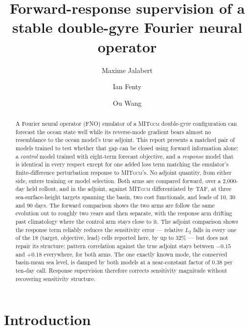 \documentclass[3p,12pt]{elsarticle}
\newcommand{\MITgcm}{\textsc{MITgcm}}
\newcommand{\FNO}{FNO}
\begin{document}
\begin{frontmatter}

\title{Forward-response supervision of a stable double-gyre Fourier neural operator}

\author[ucsb]{Maxime Jalabert}
\author[jpl]{Ian Fenty}
\author[jpl]{Ou Wang}


\begin{abstract}
A Fourier neural operator (\FNO{}) emulator of a \MITgcm{} double-gyre
configuration can forecast the ocean state well while its reverse-mode gradient
bears almost no resemblance to the ocean model's true adjoint. This report
presents a matched pair of models trained to test whether that gap can be closed
using forward information alone: a \emph{control} model trained with eight-term forecast objective, and a \emph{response} model
that is identical in every respect except for one added loss term matching the
emulator's finite-difference perturbation response to \MITgcm{}'s. No adjoint
quantity, from either side, enters training or model selection. Both arms are
compared forward, over a 2{,}000-day held rollout, and in the adjoint, against
\MITgcm{} differentiated by TAF, at three sea-surface-height targets spanning the
basin, two cost functionals, and leads of 10, 30 and 90 days. The forward
comparison shows the two arms are follow the same evolution out to roughly two years and
then separate, with the response arm drifting past climatology
where the control arm stays close to it. The adjoint comparison shows the
response term reliably reduces the sensitivity error --- relative $L_2$ falls in
every one of the 18 (target, objective, lead) cells reported here, by up to
32\% --- but does not repair its structure: pattern correlation against the true
adjoint stays between $-0.15$ and $+0.18$ everywhere, for both arms. The one
exactly known mode, the conserved basin-mean sea level, is damped by both models
at a near-constant factor of $0.38$ per ten-day call. Response supervision
therefore corrects sensitivity magnitude without recovering sensitivity
structure.
\end{abstract}

\end{frontmatter}

\section{Introduction}
\label{sec:intro}
\end{document}
